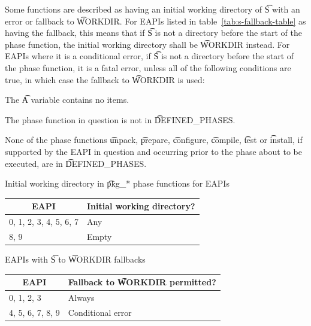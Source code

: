  Some functions are described as having an initial working
directory of \t{S} with an error or fallback to \t{WORKDIR}\@. For EAPIs listed in
table~\ref{tab:s-fallback-table} as having the fallback, this means that if \t{S} is not a directory
before the start of the phase function, the initial working directory shall be \t{WORKDIR} instead.
For EAPIs where it is a conditional error, if \t{S} is not a directory before the start of the phase
function, it is a fatal error, unless all of the following conditions are true, in which case the
fallback to \t{WORKDIR} is used:

\begin{compactitem}
\item The \t{A} variable contains no items.
\item The phase function in question is not in \t{DEFINED_PHASES}.
\item None of the phase functions \t{unpack}, \t{prepare}, \t{configure}, \t{compile}, \t{test} or
    \t{install}, if supported by the EAPI in question and occurring prior to the phase about to be
    executed, are in \t{DEFINED_PHASES}.
\end{compactitem}

\begin{centertable}{Initial working directory in \t{pkg_*} phase functions for EAPIs}
    \label{tab:function-dirs}
    \begin{tabular}{ll}
      \toprule
      \multicolumn{1}{c}{\textbf{EAPI}} &
      \multicolumn{1}{c}{\textbf{Initial working directory?}} \\
      \midrule
      0, 1, 2, 3, 4, 5, 6, 7  & Any   \\
      8, 9                    & Empty \\
      \bottomrule
    \end{tabular}
\end{centertable}

\begin{centertable}{EAPIs with \t{S} to \t{WORKDIR} fallbacks}
    \label{tab:s-fallback-table}
    \begin{tabular}{ll}
      \toprule
      \multicolumn{1}{c}{\textbf{EAPI}} &
      \multicolumn{1}{c}{\textbf{Fallback to \t{WORKDIR} permitted?}} \\
      \midrule
      0, 1, 2, 3        & Always            \\
      4, 5, 6, 7, 8, 9  & Conditional error \\
      \bottomrule
    \end{tabular}
\end{centertable}

